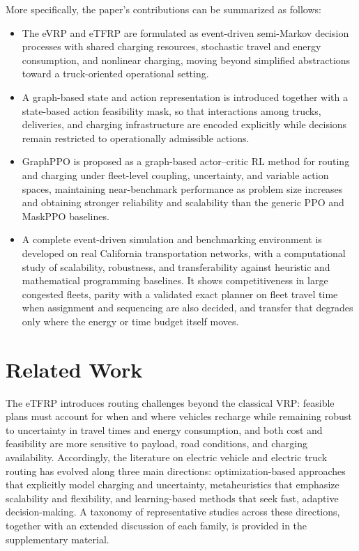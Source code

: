 \documentclass[journal]{IEEEtran}
\begin{document}
More specifically, the paper's contributions can be summarized as follows:
\begin{itemize}
    \item The eVRP and eTFRP are formulated as event-driven semi-Markov decision processes with shared charging resources, stochastic travel and energy consumption, and nonlinear charging, moving beyond simplified abstractions toward a truck-oriented operational setting.

    \item A graph-based state and action representation is introduced together with a state-based action feasibility mask, so that interactions among trucks, deliveries, and charging infrastructure are encoded explicitly while decisions remain restricted to operationally admissible actions.

    \item GraphPPO is proposed as a graph-based actor--critic RL method for routing and charging under fleet-level coupling, uncertainty, and variable action spaces, maintaining near-benchmark performance as problem size increases and obtaining stronger reliability and scalability than the generic PPO and MaskPPO baselines.

    \item A complete event-driven simulation and benchmarking environment is developed on real California transportation networks, with a computational study of scalability, robustness, and transferability against heuristic and mathematical programming baselines. It shows competitiveness in large congested fleets, parity with a validated exact planner on fleet travel time when assignment and sequencing are also decided, and transfer that degrades only where the energy or time budget itself moves.
\end{itemize}



\section{Related Work}

The eTFRP introduces routing challenges beyond the classical VRP: feasible plans must account for when and where vehicles recharge while remaining robust to uncertainty in travel times and energy consumption, and both cost and feasibility are more sensitive to payload, road conditions, and charging availability. Accordingly, the literature on electric vehicle and electric truck routing has evolved along three main directions: optimization-based approaches that explicitly model charging and uncertainty, metaheuristics that emphasize scalability and flexibility, and learning-based methods that seek fast, adaptive decision-making. A taxonomy of representative studies across these directions, together with an extended discussion of each family, is provided in the supplementary material. 
\end{document}
